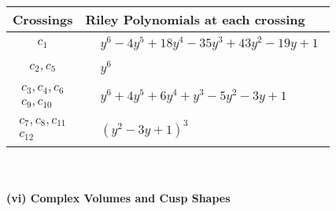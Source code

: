 \documentclass[1p]{elsarticle_modified}
\theoremstyle{definition}
\begin{document}
\begin{tabular}{m{50pt}|m{274pt}}
Crossings & \hspace{64pt}Riley Polynomials at each crossing \\
\hline $$\begin{aligned}c_{1}\end{aligned}$$&$\begin{aligned}
&y^6-4 y^5+18 y^4-35 y^3+43 y^2-19 y+1
\end{aligned}$\\
\hline $$\begin{aligned}c_{2},c_{5}\end{aligned}$$&$\begin{aligned}
&y^6
\end{aligned}$\\
\hline $$\begin{aligned}c_{3},c_{4},c_{6}\\c_{9},c_{10}\end{aligned}$$&$\begin{aligned}
&y^6+4 y^5+6 y^4+y^3-5 y^2-3 y+1
\end{aligned}$\\
\hline $$\begin{aligned}c_{7},c_{8},c_{11}\\c_{12}\end{aligned}$$&$\begin{aligned}
&(y^2-3 y+1)^3
\end{aligned}$\\
\hline
\end{tabular}\\~\\
\newpage\flushleft \textbf{(vi) Complex Volumes and Cusp Shapes}
\end{document}
